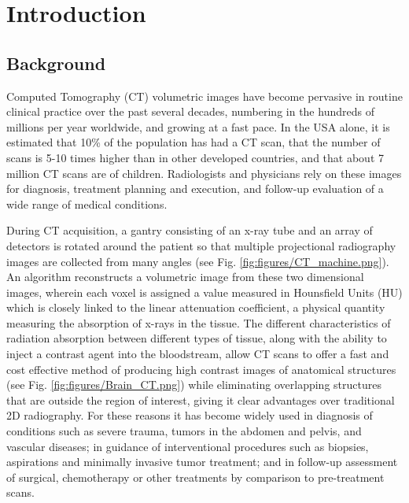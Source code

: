 \chapter{Introduction}

\section{Background}

Computed Tomography (CT) volumetric images have become pervasive in routine clinical practice over the past several decades, numbering in the hundreds of millions per year worldwide, and growing at a fast pace. 
In the USA alone, it is estimated that 10\% of the population has had a CT scan, that the number of scans is 5-10 times higher than in other developed countries, and that about 7 million CT scans are of children.
Radiologists and physicians rely on these images for diagnosis, treatment planning and execution, and follow-up evaluation of a wide range of medical conditions.

During CT acquisition, a gantry consisting of an x-ray tube and an array of detectors is rotated around the patient so that multiple projectional radiography images are collected from many angles (see Fig. \ref{fig:figures/CT_machine.png}).
An algorithm reconstructs a volumetric image from these two dimensional images, wherein each voxel is assigned a value measured in Hounsfield Units (HU) which is closely linked to the linear attenuation coefficient, a physical quantity measuring the absorption of x-rays in the tissue.
The different characteristics of radiation absorption between different types of tissue, along with the ability to inject a contrast agent into the bloodstream, allow CT scans to offer a fast and cost effective method of producing high contrast images of anatomical structures (see Fig. \ref{fig:figures/Brain_CT.png}) while eliminating overlapping structures that are outside the region of interest, giving it clear advantages over traditional 2D radiography.
For these reasons it has become widely used in diagnosis of conditions such as severe trauma, tumors in the abdomen and pelvis, and vascular diseases; in guidance of interventional procedures such as biopsies, aspirations and minimally invasive tumor treatment; and in follow-up assessment of surgical, chemotherapy or other treatments by comparison to pre-treatment scans.

